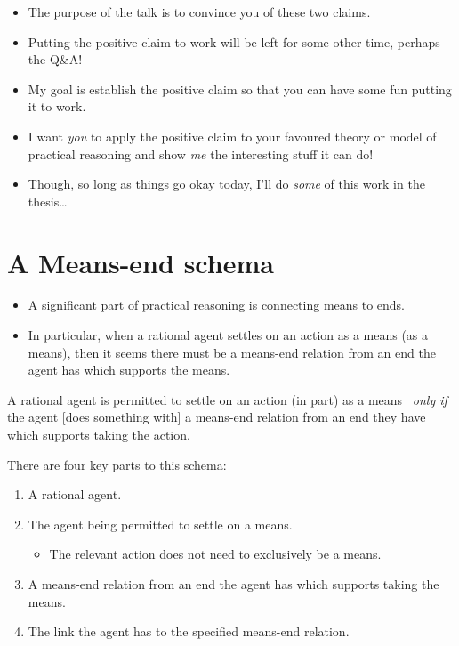 \documentclass[10pt]{article}
\newenvironment{beamerblock}[1]{%
  \tcolorbox[standard,%
  no shadow,
  noparskip,
  colback=white,
  colframe=black,
  colbacktitle=white,
  coltitle=black,
  colupper=black,
  size=small,
  boxrule=.125mm,
  fonttitle=\bfseries,
  sharp corners=all,
  title=#1]}%
{\endtcolorbox}
\newcommand{\hozlinedash}[0]{%
  \noindent\hdashrule[0.5ex][c]{\textwidth}{.1pt}{2.5pt}
}
\begin{document}
\hozlinedash

\begin{itemize}[noitemsep]
\item The purpose of the talk is to convince you of these two claims.
\item Putting the positive claim to work will be left for some other time, perhaps the Q\&A!
\item My goal is establish the positive claim so that you can have some fun putting it to work.
\item I want \emph{you} to apply the positive claim to your favoured theory or model of practical reasoning and show \emph{me} the interesting stuff it can do!
\item Though, so long as things go okay today, I'll do \emph{some} of this work in the thesis\dots
\end{itemize}


\newpage

\section{A Means-end schema}
\label{sec:means-end-schema}


\begin{itemize}
\item A significant part of practical reasoning is connecting means to ends.
\item In particular, when a rational agent settles on an action as a means (as a means), then it seems there must be a means-end relation from an end the agent has which supports the means.
\end{itemize}

\begin{beamerblock}{Means-end schema}
  A rational agent is permitted to settle on an action (in part) as a means
  \newline
  \mbox{ }\hfill\emph{only if}\hfill\mbox{ }
  \newline
  the agent [{does something with}] a means-end relation from an end they have which supports taking the action.
\end{beamerblock}

There are four key parts to this schema:
\begin{enumerate}[label=\arabic*., ref=(\arabic*)]
\item A rational agent.
\item The agent being permitted to settle on a means.
  \begin{itemize}
  \item The relevant action does not need to exclusively be a means.
  \end{itemize}
\item A means-end relation from an end the agent has which supports taking the means.
\item The link the agent has to the specified means-end relation.
\end{enumerate}
\end{document}
